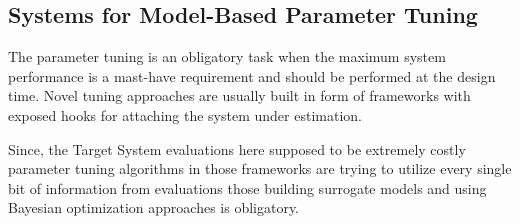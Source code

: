 \subsection{Systems for Model-Based Parameter Tuning}\label{bg: parameter tuning expamples}
The parameter tuning is an obligatory task when the maximum system performance is a mast-have requirement and should be performed at the design time.
Novel tuning approaches are usually built in form of frameworks with exposed hooks for attaching the system under estimation.

Since, the Target System evaluations here supposed to be extremely costly parameter tuning algorithms in those frameworks are trying to utilize every single bit of information from evaluations those building surrogate models and using Bayesian optimization approaches is obligatory.


